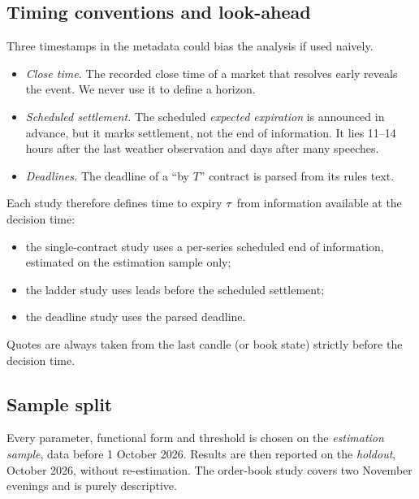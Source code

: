 \subsection{Timing conventions and look-ahead}

Three timestamps in the metadata could bias the analysis if used naively.
\begin{itemize}
  \item \emph{Close time.} The recorded close time of a market that resolves early reveals the event.
  We never use it to define a horizon.
  \item \emph{Scheduled settlement.} The scheduled \emph{expected expiration} is announced in advance,
  but it marks settlement, not the end of information. It lies 11--14 hours after the last weather
  observation and days after many speeches.
  \item \emph{Deadlines.} The deadline of a ``by $T$'' contract is parsed from its rules text.
\end{itemize}
Each study therefore defines time to expiry $\tau$ from information available at the decision
time:
\begin{itemize}
  \item the single-contract study uses a per-series scheduled end of information, estimated on the
  estimation sample only;
  \item the ladder study uses leads before the scheduled settlement;
  \item the deadline study uses the parsed deadline.
\end{itemize}
Quotes are always taken from the last candle (or book state) strictly before the decision time.

\subsection{Sample split}

Every parameter, functional form and threshold is chosen on the \emph{estimation sample}, data
before 1 October 2026. Results are then reported on the \emph{holdout}, October 2026, without
re-estimation. The order-book study covers two November evenings and is purely descriptive.
